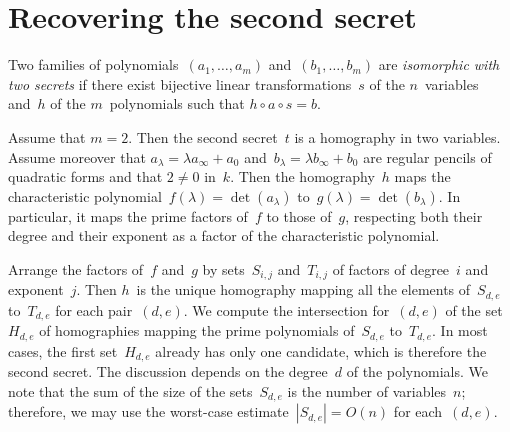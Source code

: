 \documentclass{article}%
\newtheorem{prop}{Proposition}
\let\ro\mathscr
\def\transpose{\,{}^{\mathrm{t}\!}}
\def\abs#1{\left|#1\right|}
\def\mat#1{\begin{pmatrix}#1\end{pmatrix}}
\def\card#1{\abs{#1}}
\begin{document}
% 
% 
% 
% 
\section{Recovering the second secret}

Two families of polynomials~$(a_1,…,a_m)$ and~$(b_1,…,b_m)$ are
\emph{isomorphic with two secrets} if there exist bijective linear
transformations~$s$ of the $n$~variables and~$h$ of the $m$~polynomials
such that $h ∘ a ∘ s = b$.

Assume that $m = 2$. Then the second secret~$t$ is a homography in two
variables. Assume moreover that $a_{λ} = λ a_∞ + a_0$ and~$b_{λ} = λ
b_{∞} + b_0$ are regular pencils of quadratic forms and that $2≠ 0$
in~$k$. Then the homography~$h$ maps the characteristic polynomial~$f(λ)
= \det (a_{λ})$ to~$g(λ) = \det (b_{λ})$. In particular, it maps the
prime factors of~$f$ to those of~$g$, respecting both their degree and
their exponent as a factor of the characteristic polynomial.

Arrange the factors of~$f$ and~$g$ by sets~$S_{i,j}$ and~$T_{i,j}$ of
factors of degree~$i$ and exponent~$j$. Then $h$~is the unique homography
mapping all the elements of~$S_{d,e}$ to~$T_{d,e}$ for each pair~$(d,e)$.
We compute the intersection for~$(d,e)$ of the set~$H_{d,e}$ of
homographies mapping the prime polynomials of~$S_{d,e}$ to~$T_{d,e}$. In
most cases, the first set~$H_{d,e}$ already has only one candidate, which
is therefore the second secret. The discussion depends on the degree~$d$
of the polynomials. We note that the sum of the size of the
sets~$S_{d,e}$ is the number of variables~$n$; therefore, we may use the
worst-case estimate~$\card{S_{d,e}} = O(n)$ for each~$(d,e)$.
\end{document}
